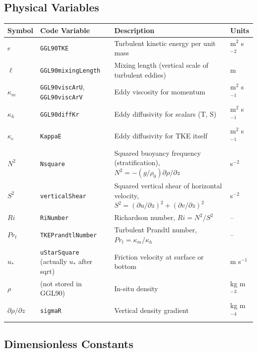 \documentclass[12pt,letterpaper]{article}
\begin{document}
\subsection*{Physical Variables}

\begin{longtable}{p{2.5cm}p{4cm}p{6cm}l}
\toprule
\textbf{Symbol} & \textbf{Code Variable} & \textbf{Description} & \textbf{Units} \\
\midrule
\endhead
$e$ & \verb|GGL90TKE| & Turbulent kinetic energy per unit mass & m$^2$ s$^{-2}$ \\
\addlinespace
$\ell$ & \verb|GGL90mixingLength| & Mixing length (vertical scale of turbulent eddies) & m \\
\addlinespace
$\kappa_m$ & \verb|GGL90viscArU|, \verb|GGL90viscArV| & Eddy viscosity for momentum & m$^2$ s$^{-1}$ \\
\addlinespace
$\kappa_h$ & \verb|GGL90diffKr| & Eddy diffusivity for scalars (T, S) & m$^2$ s$^{-1}$ \\
\addlinespace
$\kappa_e$ & \verb|KappaE| & Eddy diffusivity for TKE itself & m$^2$ s$^{-1}$ \\
\addlinespace
$N^2$ & \verb|Nsquare| & Squared buoyancy frequency (stratification), $N^2 = -(g/\rho_0) \partial\rho/\partial z$ & s$^{-2}$ \\
\addlinespace
$S^2$ & \verb|verticalShear| & Squared vertical shear of horizontal velocity, $S^2 = (\partial u/\partial z)^2 + (\partial v/\partial z)^2$ & s$^{-2}$ \\
\addlinespace
$Ri$ & \verb|RiNumber| & Richardson number, $Ri = N^2 / S^2$ & -- \\
\addlinespace
$Pr_t$ & \verb|TKEPrandtlNumber| & Turbulent Prandtl number, $Pr_t = \kappa_m / \kappa_h$ & -- \\
\addlinespace
$u_*$ & \verb|uStarSquare| (actually $u_*$ after sqrt) & Friction velocity at surface or bottom & m s$^{-1}$ \\
\addlinespace
$\rho$ & (not stored in GGL90) & In-situ density & kg m$^{-3}$ \\
\addlinespace
$\partial\rho/\partial z$ & \verb|sigmaR| & Vertical density gradient & kg m$^{-4}$ \\
\bottomrule
\end{longtable}

\subsection*{Dimensionless Constants}
\end{document}
